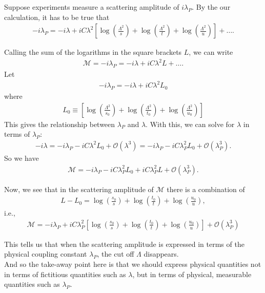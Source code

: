 \documentclass{book}
\theoremstyle{definition}
\newcommand{\f}[2]{\frac{#1}{#2}}
\newcommand{\lp}{\left(}
\newcommand{\rp}{\right)}
\newcommand{\lb}{\left[}
\newcommand{\rb}{\right]}
\begin{document}
Suppose experiments measure a scattering amplitude of $i\lambda_P$. By the our calculation, it has to be true that
\begin{align}
-i\lambda_P = -i\lambda + iC\lambda^2\lb  \log\lp \f{\Lambda^2}{s} \rp + \log\lp \f{\Lambda^2}{t} \rp + \log\lp \f{\Lambda^2}{u} \rp \rb + \dots.
\end{align}

Calling the sum of the logarithms in the square brackets $L$, we can write
\begin{align}
\mathcal{M} = -i\lambda_P = -i\lambda + iC\lambda^2 L + \dots.
\end{align}
Let
\begin{align}
-i\lambda_P = -i\lambda + iC\lambda^2 L_0
\end{align}
where
\begin{align}
L_0 \equiv \lb    \log\lp \f{\Lambda^2}{s_0} \rp + \log\lp \f{\Lambda^2}{t_0} \rp + \log\lp \f{\Lambda^2}{u_0} \rp \rb
\end{align}
This gives the relationship between $\lambda_P$ and $\lambda$. With this, we can solve for $\lambda$ in terms of $\lambda_P$:
\begin{align}
-i\lambda = -i\lambda_P - iC\lambda^2 L_0 + \mathcal{O}(\lambda^3) = -i\lambda_P - iC\lambda^2_P L_0 + \mathcal{O}(\lambda_P^3).
\end{align}
So we have
\begin{align}
\mathcal{M} = -i\lambda_P - iC\lambda_P^2 L_0 +iC\lambda_P^2 L + \mathcal{O}(\lambda_P^3).
\end{align}


Now, we see that in the scattering amplitude of $\mathcal{M}$ there is a combination of
\begin{align}
L - L_0 = \log \lp \f{s_0}{s} \rp + \log \lp \f{t_0}{t} \rp + \log \lp \f{u_0}{u} \rp,
\end{align}
i.e.,
\begin{align}
\boxed{\mathcal{M} = -i\lambda_P + iC\lambda_P^2 \lb \log \lp \f{s_0}{s} \rp + \log \lp \f{t_0}{t} \rp + \log \lp \f{u_0}{u} \rp  \rb + \mathcal{O}(\lambda_P^3)}
\end{align}


This tells us that when the scattering amplitude is expressed in terms of the physical coupling constant $\lambda_P$, the cut off $\Lambda$ disappears. \\


And so the take-away point here is that we should express physical quantities not in terms of fictitious quantities such as $\lambda$, but in terms of physical, measurable quantities such as $\lambda_P$. \\
\end{document}
